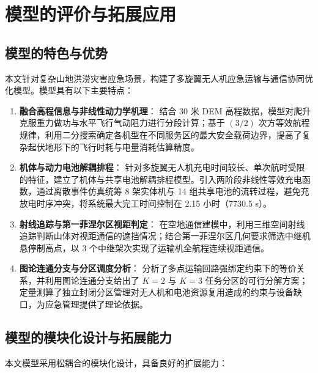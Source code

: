 \section{模型的评价与拓展应用}

\subsection{模型的特色与优势}

本文针对复杂山地洪涝灾害应急场景，构建了多旋翼无人机应急运输与通信协同优化模型。模型具有以下主要特点：

\begin{enumerate}
    \item \textbf{融合高程信息与非线性动力学机理}：
    结合 30 米 DEM 高程数据，模型对爬升克服重力做功与水平飞行气动阻力进行分段计算；基于 $(3/2)$ 次方等效航程规律，利用二分搜索确定各机型在不同服务区的最大安全载荷边界，提高了复杂起伏地形下的飞行时耗与电量消耗估算精度。
    
    \item \textbf{机体与动力电池解耦排程}：
    针对多旋翼无人机充电时间较长、单次航时受限的特征，建立了机体与共享电池解耦排程模型。引入两阶段非线性等效充电函数，通过离散事件仿真统筹 8 架实体机与 14 组共享电池的流转过程，避免充放电时序冲突，将系统最大完工时间控制在 2.15 小时（7730.5 s）。
    
    \item \textbf{射线追踪与第一菲涅尔区视距判定}：
    在空地通信建模中，利用三维空间射线追踪判断山体对视距通信的遮挡情况；结合第一菲涅尔区几何要求筛选中继机悬停制高点，以 3 个中继架次实现了运输机全航程连续视距通信。
    
    \item \textbf{图论连通分支与分区调度分析}：
    分析了多点运输回路强绑定约束下的等价关系，并利用图论连通分支给出了 $K=2$ 与 $K=3$ 任务分区的可行分解方案；定量测算了独立封闭分区管理对无人机和电池资源复用造成的约束与设备缺口，为应急管理提供了理论依据。
\end{enumerate}

\subsection{模型的模块化设计与拓展能力}

本文模型采用松耦合的模块化设计，具备良好的扩展能力：

